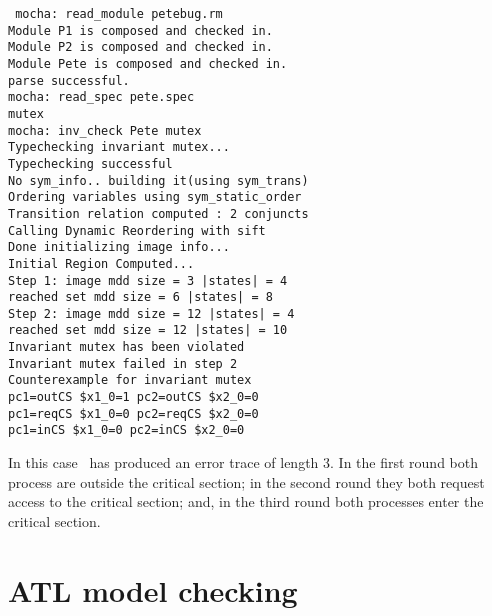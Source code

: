 \mypar
{\tt
mocha: read\_module petebug.rm \\
Module P1 is composed and checked in. \\
Module P2 is composed and checked in. \\
Module Pete is composed and checked in. \\
parse successful. \\
mocha: read\_spec pete.spec \\
mutex \\
mocha: inv\_check Pete mutex \\
Typechecking invariant mutex... \\
Typechecking successful \\
No sym\_info.. building it(using sym\_trans) \\
Ordering variables using sym\_static\_order \\
Transition relation computed : 2 conjuncts \\
Calling Dynamic Reordering with sift \\
Done initializing image info... \\
Initial Region Computed... \\
Step 1: image mdd size =          3      |states| =        4    \\
reached set mdd size =          6        |states| =        8  \\
Step 2: image mdd size =         12      |states| =        4  \\
reached set mdd size =         12        |states| =       10 \\
Invariant mutex has been violated \\
Invariant mutex failed in step 2  \\
Counterexample for invariant mutex \\
pc1=outCS \$x1\_0=1 pc2=outCS \$x2\_0=0 \\
pc1=reqCS \$x1\_0=0 pc2=reqCS \$x2\_0=0 \\
pc1=inCS \$x1\_0=0 pc2=inCS \$x2\_0=0  \\
}

\mypar
In this case \mocha\ has produced an error trace of length 3. In the first
round both process are outside the critical section; in the second round
they both request access to the critical section; and, in the third round
both processes enter the critical section.

\section{ATL model checking}

